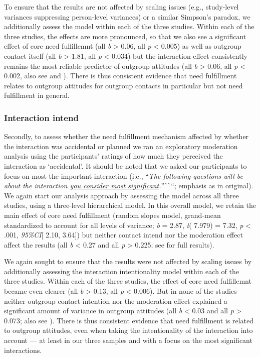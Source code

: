 To ensure that the results are not affected by scaling issues (e.g.,
study-level variances suppressing person-level variances) or a similar
Simpson's paradox, we additionally assess the model within each of the
three studies. Within each of the three studies, the effects are more
pronounced, so that we also see a significant effect of core need
fulfillemnt (all \textit{b} \textgreater{} 0.06, all \textit{p}
\textless{} 0.005) as well as outgroup contact itself (all
\textbar{}\textit{b}\textbar{} \textgreater{} 1.81, all \textit{p}
\textless{} 0.034) but the interaction effect consistently remains the
most reliable predictor of outgroup attitudes (all
\textbar{}\textit{b}\textbar{} \textgreater{} 0.06, all \textit{p}
\textless{} 0.002, also see  and
). There is thus consistent evidence that need
fulfillment relates to outgroup attitudes for outgroup contacts in
particular but not need fulfillment in general.

\subsubsection{Interaction intend}

Secondly, to assess whether the need fulfillment mechanism affected by
whether the interaction was accidental or planned we ran an exploratory
moderation analysis using the participants' ratings of how much they
perceived the interaction as `accidental'. It should be noted that we
asked our participants to focus on most the important interaction (i.e.,
``\textit{The following questions will be about the interaction \underline{you consider most significant}.}'''\,'\,``;
emphasis as in original). We again start our analysis approach by
assessing the model across all three studies, using a three-level
hierarchical model. In this overall model, we retain the main effect of
core need fulfillment (random slopes model, grand-mean standardized to
account for all levels of variance; \textit{b} = 2.87, \textit{t}(
7.979) = 7.32, \textit{p} \textless{} .001, \textit{95\%CI}{[} 2.10,
3.64{]}) but neither contact intend nor the moderation effect affect the
results (all \textbar{}\textit{b}\textbar{} \textless{} 0.27 and all
\textit{p} \textgreater{} 0.225; see  for
full results).

We again sought to ensure that the results were not affected by scaling
issues by additionally assessing the interaction intentionality model
within each of the three studies. Within each of the three studies, the
effect of core need fulfillemnt became even clearer (all
\textbar{}\textit{b}\textbar{} \textgreater{} 0.13, all \textit{p}
\textless{} 0.006). But in none of the studies neither outgroup contact
intention nor the moderation effect explained a significant amount of
variance in outgroup attitudes (all \textbar{}\textit{b}\textbar{}
\textless{} 0.03 and all \textit{p} \textgreater{} 0.073; also see
). There is thus consistent evidence that
need fulfillment is related to outgroup attitudes, even when taking the
intentionality of the interaction into account --- at least in our three
samples and with a focus on the most significant interactions.


